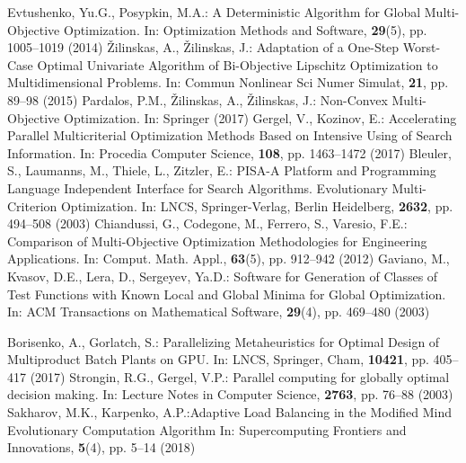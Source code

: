 \documentclass[runningheads]{llncs}
\begin{document}
\begin{thebibliography}{}
	Evtushenko, Yu.G., Posypkin, M.A.: A Deterministic Algorithm for Global Multi-Objective Optimization. In: Optimization Methods and Software, \textbf{29}(5), pp. 1005--1019 (2014)
	{\v Z}ilinskas, A., {\v Z}ilinskas, J.: Adaptation of a One-Step Worst-Case Optimal Univariate Algorithm of Bi-Objective Lipschitz Optimization to Multidimensional Problems. In: Commun Nonlinear Sci Numer Simulat, \textbf{21}, pp. 89--98 (2015)
	Pardalos, P.M., {\v Z}ilinskas, A., {\v Z}ilinskas, J.: Non-Convex Multi-Objective Optimization. In: Springer (2017)
	Gergel, V., Kozinov, E.: Accelerating Parallel Multicriterial Optimization Methods Based on Intensive Using of Search Information. In: Procedia Computer Science, \textbf{108}, pp. 1463--1472 (2017) 
	Bleuler, S., Laumanns, M., Thiele, L., Zitzler, E.: PISA-A Platform and Programming Language Independent Interface for Search Algorithms. Evolutionary Multi-Criterion Optimization. In: LNCS, Springer-Verlag, Berlin Heidelberg, \textbf{2632}, pp. 494--508 (2003)
	Chiandussi, G., Codegone, M., Ferrero, S., Varesio, F.E.: Comparison of Multi-Objective Optimization Methodologies for Engineering Applications. In: Comput. Math. Appl., \textbf{63}(5), pp. 912--942 (2012)
	Gaviano, M., Kvasov, D.E., Lera, D., Sergeyev, Ya.D.: Software for Generation of Classes of Test Functions with Known Local and Global Minima for Global Optimization. In: ACM Transactions on Mathematical Software, \textbf{29}(4), pp. 469--480 (2003)

	Borisenko, A., Gorlatch, S.: Parallelizing Metaheuristics for Optimal Design of Multiproduct Batch Plants on GPU. In: LNCS, Springer, Cham, \textbf{10421}, pp. 405--417 (2017)
	Strongin, R.G., Gergel, V.P.: Parallel computing for globally optimal decision making. In: Lecture Notes in Computer Science, \textbf{2763}, pp. 76--88 (2003)  
	Sakharov, M.K., Karpenko, A.P.:Adaptive Load Balancing in the Modified Mind Evolutionary Computation Algorithm In: Supercomputing Frontiers and Innovations, \textbf{5}(4), pp. 5--14 (2018) 


\end{thebibliography}
\end{document}
